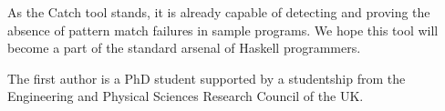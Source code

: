 \documentclass[preprint]{sigplanconf}
\begin{document}
As the Catch tool stands, it is already capable of detecting and proving the absence of pattern match failures in sample programs. We hope this tool will become a part of the standard arsenal of Haskell programmers.


%

\acks

The first author is a PhD student supported by a studentship from the Engineering and Physical Sciences Research Council of the UK.



\end{document}
